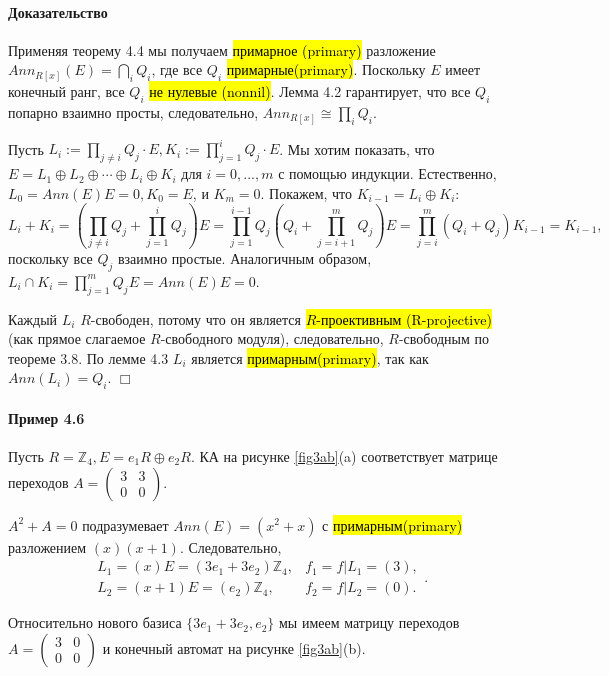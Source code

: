 \documentclass[a4paper,12pt]{article}
\begin{document}
\paragraph{Доказательство}
Применяя теорему 4.4 мы получаем \hl{примарное (primary)} разложение $Ann_{R[x]} (E) = \bigcap_{i} Q_i$, где все $Q_i$ \hl{примарные(primary)}. Поскольку $E$ имеет конечный ранг, все $Q_i$ \hl{не нулевые (nonnil)}. Лемма 4.2 гарантирует, что все $Q_i$ попарно взаимно просты, следовательно, $Ann_{R[x]} \cong \prod_{i} Q_i$.

Пусть $L_i := \prod_{j \ne i} Q_j \cdot E, K_i := \prod_{j=1}^{i} Q_j \cdot E$. Мы хотим показать, что $E = L_1 \oplus L_2 \oplus \cdots \oplus L_i \oplus K_i$ для $i = 0, ..., m$ с помощью индукции.
Естественно, $L_0 = Ann(E) E = 0, K_0 = E$, и $K_m = 0$. Покажем, что $K_{i-1} = L_i \oplus K_i$:
$$
L_i + K_i = \left( \prod_{j \ne i} Q_j + \prod_{j=1}^{i}Q_j\right) E = \prod_{j = 1}^{i - 1}Q_j \left( Q_i + \prod_{j = i+1}^{m} Q_j \right) E = \prod_{j = i}^{m} (Q_i + Q_j) K_{i-1} = K_{i-1},
$$
поскольку все $Q_j$ взаимно простые. Аналогичным образом, $L_i \cap K_i = \prod_{j=1}^{m} Q_j E = Ann(E) E = 0$.

Каждый $L_i$ $R$-свободен, потому что он является \hl{$R$-проективным (R-projective)} (как прямое слагаемое $R$-свободного модуля), следовательно, $R$-свободным по теореме 3.8. По лемме 4.3 $L_i$ является \hl{примарным(primary)}, так как $Ann(L_i) = Q_i$. $\Box$

\paragraph{Пример 4.6}
Пусть $R = \mathbb{Z}_4, E = e_1 R \oplus e_2 R$. КА на рисунке \ref{fig3ab}(a) соответствует матрице переходов
$ A =
\begin{pmatrix}
	3 & 3\\
	0 & 0
\end{pmatrix}
$.

$A^2 + A = 0$ подразумевает $Ann(E) = (x^2 + x)$ с  \hl{примарным(primary)} разложением $(x)(x + 1)$. Следовательно,
$$
\begin{array}{cc}
L_1 = (x)E = (3 e_1 + 3 e_2) \mathbb{Z}_4, & f_1 = f | L_1 = (3), \\
L_2 = (x+1)E = (e_2) \mathbb{Z}_4, & f_2 = f|L_2 = (0).
\end{array}.
$$

Относительно нового базиса $\{3 e_1 + 3 e_2, e_2\}$ мы имеем матрицу переходов ${ A =
\begin{pmatrix}
	3 & 0\\
	0 & 0
\end{pmatrix}}
$ и конечный автомат на рисунке \ref{fig3ab}(b).
\end{document}
